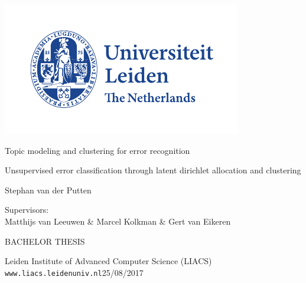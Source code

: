 \thispagestyle{empty}

\includegraphics{logoleiden}


\vspace{-2.5cm}\hfill {}

\vspace{5cm}
\begin{Large}
\hfill Topic modeling and clustering for error recognition 

\vspace*{3mm}

\hfill Unsupervised error classification through latent dirichlet allocation and clustering 

\vspace*{14mm}

\hfill Stephan van der Putten
\end{Large}


\begin{large}

\vspace{2.8cm}
Supervisors:\\
Matthijs van Leeuwen \& Marcel Kolkman \& Gert van Eikeren



BACHELOR THESIS

\vspace*{5mm}
Leiden Institute of Advanced Computer Science (LIACS)\\
\texttt{www.liacs.leidenuniv.nl}\hfill 25/08/2017
\end{large}

